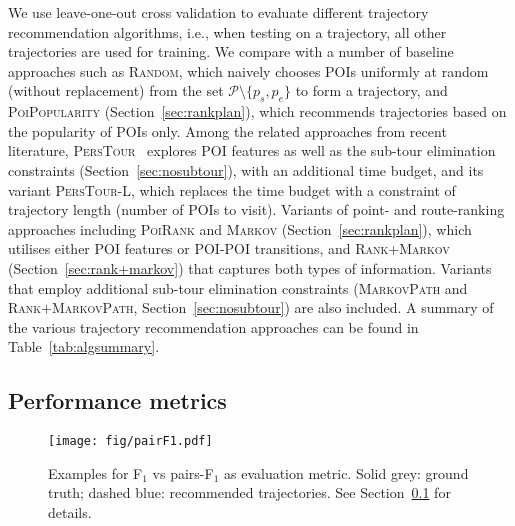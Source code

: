 We use leave-one-out cross validation to evaluate different trajectory recommendation algorithms,
i.e., when testing on a trajectory, all other trajectories are used for training.
We compare with a number of baseline approaches such as \textsc{Random},
which naively chooses POIs uniformly at random (without replacement) from the set $\mathcal{P} \setminus \{p_s, p_e \}$ to form a trajectory,
and \textsc{PoiPopularity} (Section~\ref{sec:rankplan}), which recommends trajectories based on the popularity of POIs only.
Among the related approaches from recent literature,
\textsc{PersTour}~\cite{ijcai15} explores POI features as well as the sub-tour elimination constraints (Section~\ref{sec:nosubtour}),
with an additional time budget, and its variant \textsc{PersTour-L},
which replaces the time budget with a constraint of trajectory length (number of POIs to visit).
Variants of point- and route-ranking approaches including \textsc{PoiRank} and \textsc{Markov} (Section~\ref{sec:rankplan}),
which utilises either POI features or POI-POI transitions,
and \textsc{Rank+Markov} (Section~\ref{sec:rank+markov}) that captures both types of information. %
Variants that employ additional sub-tour elimination constraints
(\textsc{MarkovPath} and \textsc{Rank+MarkovPath}, Section~\ref{sec:nosubtour}) are also included.
A summary of the various trajectory recommendation approaches can be found in Table~\ref{tab:algsummary}.






\subsection{Performance metrics}
\label{sec:metric}
\secmoveup

\begin{figure}[t]
	\centering
	\texttt{[image: fig/pairF1.pdf]}
	\caption{Examples for F$_1$ vs pairs-F$_1$ as evaluation metric.
Solid grey: ground truth; dashed blue: recommended trajectories. See Section~\ref{sec:metric} for details.}
	\label{fig:pairf1}\captionmoveup
\end{figure}

